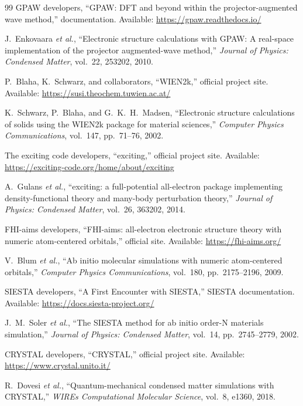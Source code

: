 \documentclass[11pt]{article}
\begin{document}
\begin{thebibliography}{99}
GPAW developers, ``GPAW: DFT and beyond within the projector-augmented wave method,'' documentation. Available: \url{https://gpaw.readthedocs.io/}

J.~Enkovaara \emph{et al.}, ``Electronic structure calculations with GPAW: A real-space implementation of the projector augmented-wave method,'' \emph{Journal of Physics: Condensed Matter}, vol.~22, 253202, 2010.

P.~Blaha, K.~Schwarz, and collaborators, ``WIEN2k,'' official project site. Available: \url{https://susi.theochem.tuwien.ac.at/}

K.~Schwarz, P.~Blaha, and G.~K.~H.~Madsen, ``Electronic structure calculations of solids using the WIEN2k package for material sciences,'' \emph{Computer Physics Communications}, vol.~147, pp.~71--76, 2002.

The exciting code developers, ``exciting,'' official project site. Available: \url{https://exciting-code.org/home/about/exciting}

A.~Gulans \emph{et al.}, ``exciting: a full-potential all-electron package implementing density-functional theory and many-body perturbation theory,'' \emph{Journal of Physics: Condensed Matter}, vol.~26, 363202, 2014.

FHI-aims developers, ``FHI-aims: all-electron electronic structure theory with numeric atom-centered orbitals,'' official site. Available: \url{https://fhi-aims.org/}

V.~Blum \emph{et al.}, ``Ab initio molecular simulations with numeric atom-centered orbitals,'' \emph{Computer Physics Communications}, vol.~180, pp.~2175--2196, 2009.

SIESTA developers, ``A First Encounter with SIESTA,'' SIESTA documentation. Available: \url{https://docs.siesta-project.org/}

J.~M.~Soler \emph{et al.}, ``The SIESTA method for ab initio order-N materials simulation,'' \emph{Journal of Physics: Condensed Matter}, vol.~14, pp.~2745--2779, 2002.

CRYSTAL developers, ``CRYSTAL,'' official project site. Available: \url{https://www.crystal.unito.it/}

R.~Dovesi \emph{et al.}, ``Quantum-mechanical condensed matter simulations with CRYSTAL,'' \emph{WIREs Computational Molecular Science}, vol.~8, e1360, 2018.


\end{thebibliography}
\end{document}
